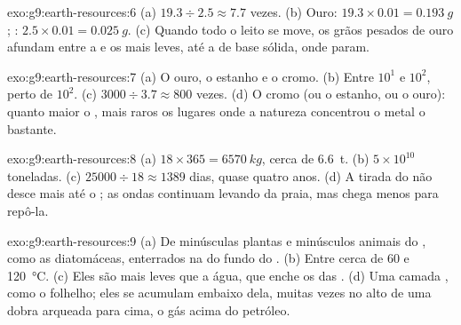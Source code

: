 \begin{solution}{exo:g9:earth-resources:6}
(a) $19.3 \div 2.5 \approx 7.7$ vezes. (b) Ouro: $19.3 \times 0.01 =
\qty{0.193}{g}$; : $2.5 \times 0.01 = \qty{0.025}{g}$. (c) Quando
todo o leito se move, os grãos pesados de ouro afundam entre a  e os
 mais leves, até a  de base sólida, onde param.
\end{solution}

\begin{solution}{exo:g9:earth-resources:7}
(a) O ouro, o estanho e o cromo. (b) Entre $10^1$ e $10^2$, perto de
$10^2$. (c) $3000 \div 3.7 \approx 800$ vezes. (d) O cromo (ou o
estanho, ou o ouro): quanto maior o , mais raros os
lugares onde a natureza concentrou o metal o bastante.
\end{solution}

\begin{solution}{exo:g9:earth-resources:8}
(a) $18 \times 365 = \qty{6570}{kg}$, cerca de \qty{6.6}{t}. (b) $5 \times
10^{10}$ toneladas. (c) $25000 \div 18 \approx 1389$ dias, quase quatro
anos. (d) A  tirada do  não desce mais até o ; as ondas
continuam levando  da praia, mas chega menos  para repô-la.
\end{solution}

\begin{solution}{exo:g9:earth-resources:9}
(a) De minúsculas plantas e minúsculos animais do , como as
diatomáceas, enterrados na  do fundo do . (b) Entre cerca de 60 e
\qty{120}{\degreeCelsius}. (c) Eles são mais leves que a água, que enche
os  das . (d) Uma camada , como o folhelho; eles se
acumulam embaixo dela, muitas vezes no alto de uma dobra arqueada para
cima, o gás acima do petróleo.
\end{solution}

